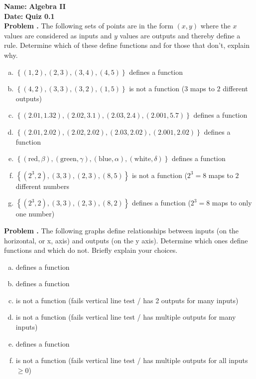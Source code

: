 \documentclass[11pt,letterpaper]{article}
\newcommand{\quiz}[2]{\noindent\textbf{Name: }\makebox[8cm]{\hrulefill} \hfill \textbf{Algebra II} \\  \textbf{Date: } \hfill \textbf{Quiz #2}\\}
\newcommand{\prob}{\noindent\textbf{Problem. }}
\newcounter{problem}
\newcommand{\problem}{
	\stepcounter{problem}%
	\noindent \textbf{Problem \theproblem. }%
}
\newcommand{\pspace}{\par\vspace{\baselineskip}}
\begin{document}
\quiz{\#}{0.1}




\problem The following sets of points are in the form $(x,y)$ where the $x$ values are considered as inputs and $y$ values are outputs and thereby define a rule. Determine which of these define functions and for those that don't, explain why.\\
	\begin{enumerate}[(a)]
	\item $\left\{ (1,2), (2,3), (3,4), (4,5)\right\}$ defines a function
	\item $\left\{ (4,2), (3,3), (3,2), (1,5)\right\}$ is not a function ($3$ maps to $2$ different outputs)
	\item $\left\{ (2.01,1.32), (2.02,3.1), (2.03,2.4), (2.001,5.7)\right\}$ defines a function
	\item $\left\{ (2.01,2.02), (2.02,2.02), (2.03,2.02), (2.001,2.02)\right\}$ defines a function
	\item $\left\{ (\text{red},\beta), (\text{green},\gamma), (\text{blue},\alpha), (\text{white},\delta)\right\}$ defines a function
	\item $\left\{ (2^3,2), (3,3), (2,3), (8,5)\right\}$ is not a function ($2^3 = 8$ maps to $2$ different numbers
	\item $\left\{ (2^3,2), (3,3), (2,3), (8,2)\right\}$ defines a function ($2^3 = 8$ maps to only one number)
	\end{enumerate} 

\vspace{.5cm}



\problem The following graphs define relationships between inputs (on the horizontal, or x, axis) and outputs (on the y axis). Determine which ones define functions and which do not. Briefly explain your choices. \\
\begin{enumerate}[(a)]
	\item defines a function
	\item defines a function
	\item is not a function (fails vertical line test / has 2 outputs for many inputs)
	\item is not a function (fails vertical line test / has multiple outputs for many inputs)
	\item defines a function
	\item is not a function (fails vertical line test / has multiple outputs for all inputs $\ge 0$)
	\end{enumerate} 
\end{document}
